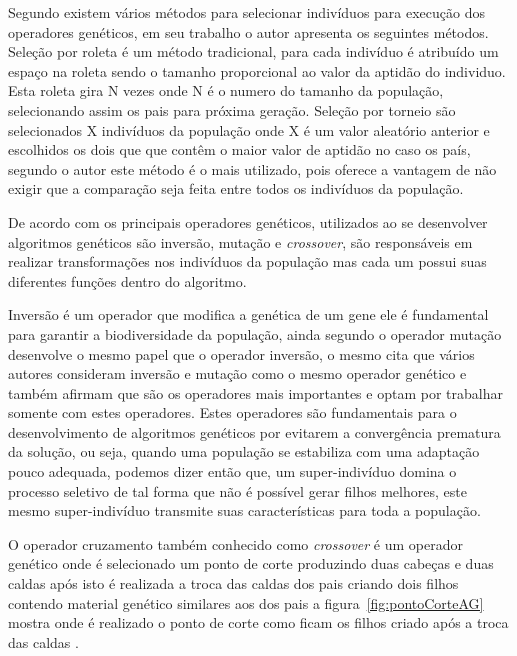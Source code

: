 \documentclass{abntpuc}
\begin{document}

Segundo \cite{lobo2005soluccao} existem vários métodos para selecionar indivíduos para execução dos operadores genéticos, em seu trabalho o autor apresenta os seguintes métodos. Seleção por roleta é um método tradicional, para cada indivíduo é atribuído um espaço na roleta sendo o tamanho proporcional ao valor da aptidão do individuo. Esta roleta gira N vezes onde N é o numero do tamanho da população, selecionando assim os pais para próxima geração. Seleção por torneio são selecionados X indivíduos da população onde X é um valor aleatório anterior e escolhidos os dois que que contêm o maior valor de aptidão no caso os país, segundo o autor este método é o mais utilizado, pois oferece a vantagem de não exigir que a comparação seja feita entre todos os indivíduos da população.\par


De acordo com \cite{goes2005otimizaccao} os principais operadores genéticos, utilizados ao se desenvolver algoritmos genéticos são inversão, mutação e \textit{crossover}, são responsáveis em realizar transformações nos indivíduos da população mas cada um possui suas diferentes funções dentro do algoritmo.\par
Inversão é um operador que modifica a genética de um gene ele é fundamental para garantir a biodiversidade da população, ainda segundo \cite{goes2005otimizaccao} o operador mutação  desenvolve o mesmo papel que o operador inversão, o mesmo cita que vários autores consideram inversão e mutação como o mesmo operador genético e também afirmam que são os operadores mais importantes e optam por trabalhar somente com estes operadores. Estes operadores são fundamentais para o desenvolvimento de algoritmos genéticos por evitarem a convergência prematura da solução, ou seja, quando uma população se estabiliza com uma adaptação pouco adequada, podemos dizer então que, um super-indivíduo domina o processo seletivo de tal forma que não é possível gerar filhos melhores, este mesmo super-indivíduo transmite suas características para toda a população.\par

O operador cruzamento também conhecido como \textit{crossover} é um operador genético onde é selecionado um ponto de corte produzindo duas cabeças e duas caldas após isto é realizada a troca das caldas dos pais criando dois filhos contendo material genético similares aos dos pais a figura~\ref{fig:pontoCorteAG} mostra onde é realizado o ponto de corte como ficam os filhos criado após a troca das caldas \cite{de1999introduccao}.
\end{document}
